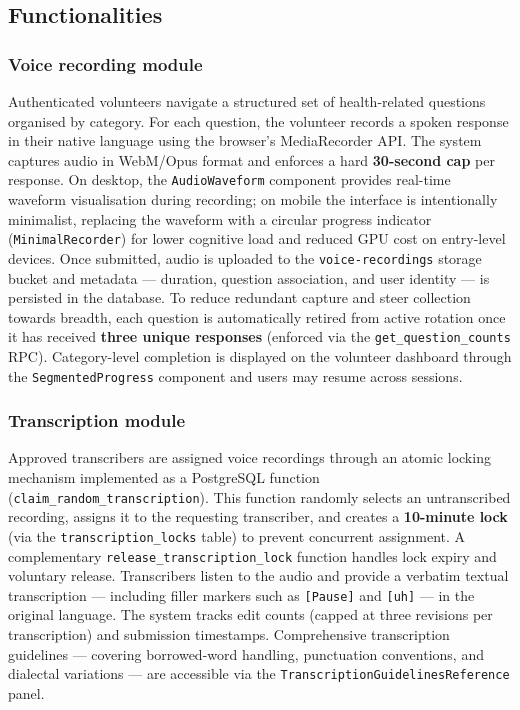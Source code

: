 \documentclass[final,5p,times,twocolumn]{elsarticle}
\begin{document}
\subsection{Functionalities}

\subsubsection{Voice recording module}
Authenticated volunteers navigate a structured set of health-related questions organised by category. For each question, the volunteer records a spoken response in their native language using the browser's MediaRecorder API. The system captures audio in WebM/Opus format and enforces a hard \textbf{30-second cap} per response. On desktop, the \texttt{AudioWaveform} component provides real-time waveform visualisation during recording; on mobile the interface is intentionally minimalist, replacing the waveform with a circular progress indicator (\texttt{MinimalRecorder}) for lower cognitive load and reduced GPU cost on entry-level devices. Once submitted, audio is uploaded to the \texttt{voice-recordings} storage bucket and metadata --- duration, question association, and user identity --- is persisted in the database. To reduce redundant capture and steer collection towards breadth, each question is automatically retired from active rotation once it has received \textbf{three unique responses} (enforced via the \texttt{get\_question\_counts} RPC). Category-level completion is displayed on the volunteer dashboard through the \texttt{SegmentedProgress} component and users may resume across sessions.

\subsubsection{Transcription module}
Approved transcribers are assigned voice recordings through an atomic locking mechanism implemented as a PostgreSQL function (\texttt{claim\_random\_transcription}). This function randomly selects an untranscribed recording, assigns it to the requesting transcriber, and creates a \textbf{10-minute lock} (via the \texttt{transcription\_locks} table) to prevent concurrent assignment. A complementary \texttt{release\_transcription\_lock} function handles lock expiry and voluntary release. Transcribers listen to the audio and provide a verbatim textual transcription --- including filler markers such as \texttt{[Pause]} and \texttt{[uh]} --- in the original language. The system tracks edit counts (capped at three revisions per transcription) and submission timestamps. Comprehensive transcription guidelines --- covering borrowed-word handling, punctuation conventions, and dialectal variations --- are accessible via the \texttt{TranscriptionGuidelinesReference} panel.
\end{document}
